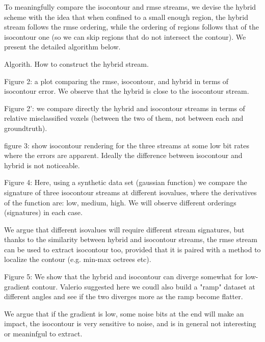To meaningfully compare the isocontour and rmse streams, we devise the hybrid scheme with the idea that when confined to a small enough region, the hybrid stream follows the rmse ordering, while the ordering of regions follows that of the isocontour one (so we can skip regions that do not intersect the contour). We present the detailed algorithm below.

Algorith. How to construct the hybrid stream.

Figure 2: a plot comparing the rmse, isocontour, and hybrid in terms of isocontour error. We observe that the hybrid is close to the isocontour stream.

Figure 2': we compare directly the hybrid and isocontour streams in terms of relative misclassified voxels (between the two of them, not between each and groundtruth).

figure 3: show isocontour rendering for the three streams at some low bit rates where the errors are apparent. Ideally the difference between isocontour and hybrid is not noticeable.


Figure 4:
Here, using a synthetic data set (gaussian function) we compare the signature of three isocontour streams at different isovalues, where the derivatives of the function are: low, medium, high. We will observe different orderings (signatures) in each case.

We argue that different isovalues will require different stream signatures, but thanks to the similarity between hybrid and isocontour streams, the rmse stream can be used to extract isocontour too, provided that it is paired with a method to localize the contour (e.g. min-max octrees etc).

Figure 5:
We show that the hybrid and isocontour can diverge somewhat for low-gradient contour. Valerio suggested here we coudl also build a "ramp" dataset at different angles and see if the two diverges more as the ramp become flatter.

We argue that if the gradient is low, some noise bits at the end will make an impact, the isocontour is very sensitive to noise, and is in general not interesting or meaninfgul to extract.